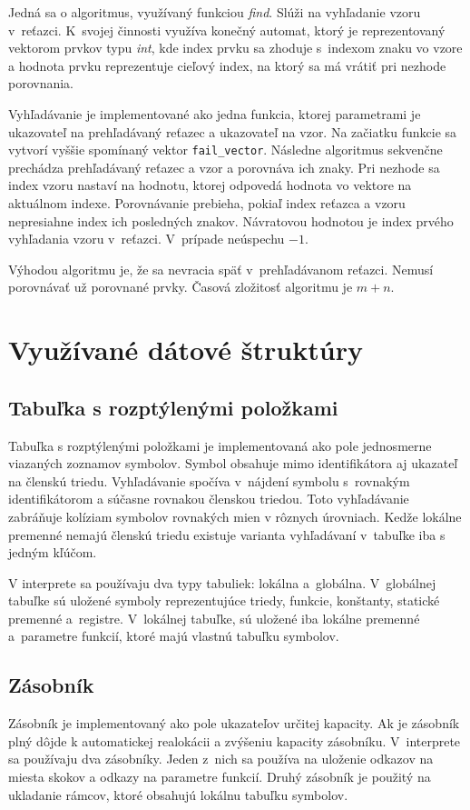 \documentclass[11pt,a4paper]{article}
\begin{document}
	Jedná sa o algoritmus, využívaný funkciou \textit{find}. Slúži na vyhľadanie vzoru v~reťazci. K~svojej činnosti využíva konečný automat, ktorý je reprezentovaný vektorom prvkov typu \textit{int}, kde index prvku sa zhoduje s~indexom znaku vo vzore a hodnota prvku reprezentuje cieľový index, na ktorý sa má vrátiť pri nezhode porovnania.
		
	Vyhľadávanie je implementované ako jedna funkcia, ktorej parametrami je ukazovateľ na prehľadávaný reťazec a ukazovateľ na vzor. Na začiatku funkcie sa vytvorí vyššie spomínaný vektor \texttt{fail\_vector}. Následne algoritmus sekvenčne prechádza prehľadávaný reťazec a vzor a porovnáva ich znaky. Pri nezhode sa index vzoru nastaví na hodnotu, ktorej odpovedá hodnota vo vektore na aktuálnom indexe. Porovnávanie prebieha, pokiaľ index reťazca a vzoru nepresiahne	index ich posledných znakov. Návratovou hodnotou je index prvého vyhľadania vzoru v~reťazci. V~prípade neúspechu $-1$.	
	
	Výhodou algoritmu je, že sa nevracia späť v~prehľadávanom reťazci. Nemusí porovnávať už porovnané prvky. Časová zložitosť algoritmu je ${m+n}$.
	
	\section{Využívané dátové štruktúry}
	\label{struktury}
	
	\subsection{Tabuľka s rozptýlenými položkami}
	Tabuľka s rozptýlenými položkami je implementovaná ako pole jednosmerne
	viazaných zoznamov symbolov. Symbol obsahuje
	mimo identifikátora aj ukazateľ na členskú triedu. Vyhľadávanie spočíva
	v~nájdení symbolu s~rovnakým identifikátorom
	a súčasne rovnakou členskou triedou. Toto vyhľadávanie zabráňuje kolíziam
	symbolov rovnakých mien v rôznych úrovniach.
	Kedže lokálne premenné nemajú členskú triedu existuje varianta vyhľadávaní v~tabuľke
	iba s jedným kľúčom.
	
	V interprete sa používaju dva typy tabuliek: lokálna a~globálna. V~globálnej
	tabuľke sú uložené symboly reprezentujúce triedy, funkcie, konštanty, statické
	premenné a~registre. V~lokálnej tabuľke, sú uložené iba lokálne premenné a~parametre
	funkcií, ktoré majú vlastnú tabuľku symbolov.
	
	\subsection{Zásobník}
	Zásobník je implementovaný ako pole ukazateľov určitej kapacity. Ak je zásobník
	plný dôjde k automatickej realokácii a zvýšeniu kapacity zásobníku.
	V~interprete sa používaju dva zásobníky. Jeden z~nich sa používa na uloženie
	odkazov na miesta skokov a odkazy na parametre funkcií. Druhý zásobník je
	použitý na ukladanie rámcov, ktoré obsahujú lokálnu tabuľku symbolov.
	
\end{document}
